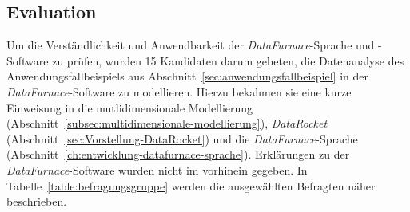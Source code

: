 \documentclass[
  language=german, %
  type=bachelor,%
  ngerman
]{isthesis}
\begin{document}
\begin{content}


%  


\chapter{Evaluation}\label{ch:evaluation}

Um die Verständlichkeit und Anwendbarkeit der \textit{DataFurnace}-Sprache und
-Software zu prüfen, wurden 15 Kandidaten darum gebeten, die Datenanalyse des
Anwendungsfallbeispiels aus Abschnitt~\ref{sec:anwendungsfallbeispiel} in der
\textit{DataFurnace}-Software zu modellieren. Hierzu bekahmen sie eine kurze
Einweisung in die mutlidimensionale Modellierung
(Abschnitt~\ref{subsec:multidimensionale-modellierung}), \textit{DataRocket}
(Abschnitt~\ref{sec:Vorstellung-DataRocket}) und die
\textit{DataFurnace}-Sprache
(Abschnitt~\ref{ch:entwicklung-datafurnace-sprache}). Erklärungen zu der
\textit{DataFurnace}-Software wurden nicht im vorhinein gegeben.  In
Tabelle~\ref{table:befragungsgruppe} werden die ausgewählten Befragten näher
beschrieben.


\end{content}
\end{document}
